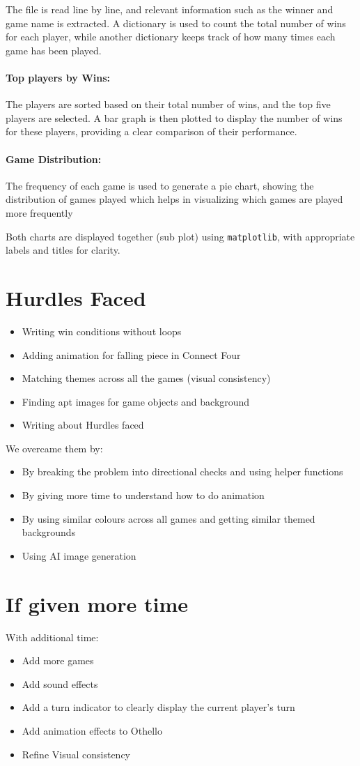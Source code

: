 \documentclass[12pt,a4paper]{article}
\begin{document}
The file is read line by line, and relevant information such as the winner and game name is extracted. A dictionary is used to count the total number of wins for each player, while another dictionary keeps track of how many times each game has been played.
\paragraph{Top players by Wins:}
The players are sorted based on their total number of wins, and the top five players are selected. A bar graph is then plotted to display the number of wins for these players, providing a clear comparison of their performance.
\paragraph{Game Distribution:}
The frequency of each game is used to generate a pie chart, showing the distribution of games played which helps in visualizing which games are played more frequently

Both charts are displayed together (sub plot) using \texttt{matplotlib}, with appropriate labels and titles for clarity.
\section{Hurdles Faced}
\begin{itemize}
    \item Writing win conditions without loops
    \item Adding animation for falling piece in Connect Four
    \item Matching themes across all the games (visual consistency)
    \item Finding apt images for game objects and background
    \item Writing about Hurdles faced
\end{itemize}
We overcame them by:
\begin{itemize}
    \item By breaking the problem into directional checks and using helper functions
    \item By giving more time to understand how to do animation 
    \item By using similar colours across all games and getting similar themed backgrounds
    \item Using AI image generation 
\end{itemize}
\section{If given more time}
With additional time:
\begin{itemize}
    \item Add more games
    \item Add sound effects
    \item Add a turn indicator to clearly display the current player's turn
    \item Add animation effects to Othello
    \item Refine Visual consistency
\end{itemize}
\end{document}
